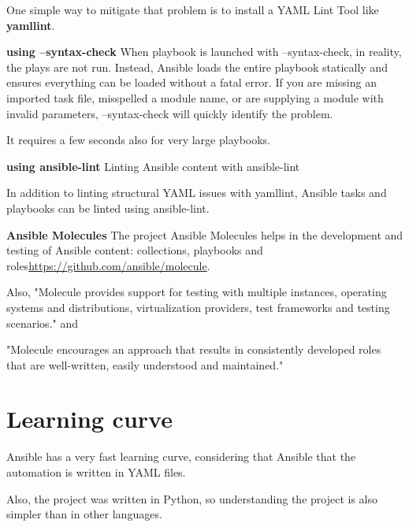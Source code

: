 \documentclass[12pt,a4paper,openright,twoside]{book}
\begin{document}
One simple way to mitigate that problem is to install a YAML Lint Tool like \textbf{yamllint}.

\textbf{using --syntax-check}
When playbook is launched with --syntax-check, in reality, the plays are not run. Instead, Ansible loads the entire playbook statically and ensures everything can be loaded without a fatal error. If you are missing an imported task file, misspelled a module name, or are supplying a module with invalid parameters, --syntax-check will quickly identify the problem.


It requires a few seconds also for very large playbooks.

\textbf{using ansible-lint}
Linting Ansible content with ansible-lint


In addition to linting structural YAML issues with yamllint, Ansible tasks and playbooks can be linted using ansible-lint.

\textbf{Ansible Molecules}
The project Ansible Molecules helps in the development and testing of Ansible content: collections, playbooks and roles\url{https://github.com/ansible/molecule}.


Also, "Molecule provides support for testing with multiple instances, operating systems and distributions, virtualization providers, test frameworks and testing scenarios." and 


"Molecule encourages an approach that results in consistently developed roles that are well-written, easily understood and maintained."\cite{ansibleMolecule}


\section{Learning curve}
Ansible has a very fast learning curve, considering that Ansible that the automation is written in YAML files.


Also, the project was written in Python, so understanding the project is also simpler than in other languages.

\end{document}
